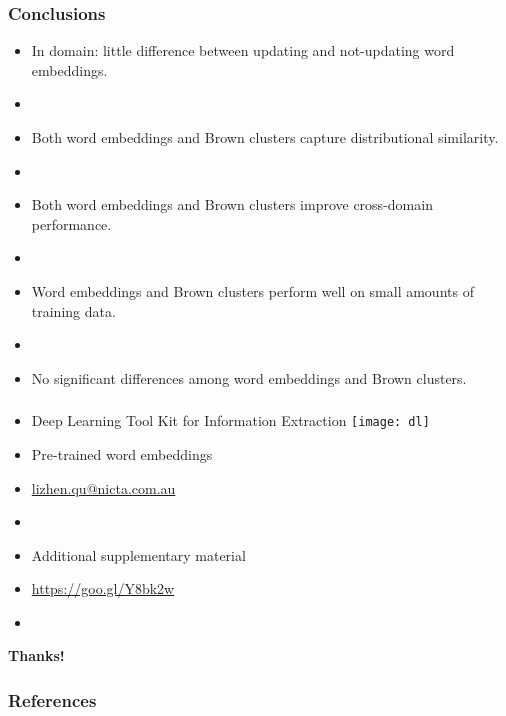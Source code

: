 \documentclass{beamer}
\begin{document}
\begin{frame}
\frametitle{\textbf{Conclusions}}

\begin{itemize}
\item[\ding{51}] In domain: little difference between updating and not-updating word embeddings.
\item[]
\item[\ding{51}] Both word embeddings and Brown clusters capture distributional similarity.
\item[] 
\item[\ding{51}] Both word embeddings and Brown clusters improve cross-domain performance.
\item[]
\item[\ding{51}] Word embeddings and Brown clusters perform well on small amounts of
training data.
\item[]
\item[\ding{51}] No significant differences among word embeddings and Brown clusters.
\end{itemize}
\end{frame}


\begin{frame}
\frametitle{}

\begin{itemize}
\centering
\item[] Deep Learning Tool Kit for Information Extraction 
\texttt{[image: dl]}
\item[] Pre-trained word embeddings 
\item[\ding{224}]  \url{lizhen.qu@nicta.com.au}
\item[]
\item[] Additional supplementary material 
\item[\ding{224}] \url{https://goo.gl/Y8bk2w}
\item[]
\end{itemize}

\centering \textbf{{\LARGE Thanks!}}

\end{frame}




\begin{frame}[allowframebreaks]
\frametitle{\textbf{References}}
	
	
\end{frame}
\end{document}
